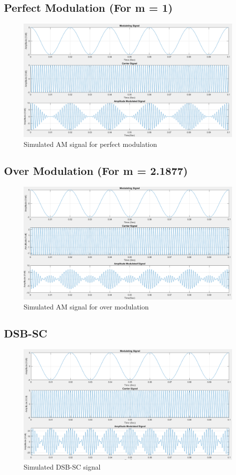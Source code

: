\documentclass{lab_sheet}
\begin{document}
  \subsection*{Perfect Modulation (For m = 1)}
  \begin{figure}[H]
    \centering
           \includegraphics[width=.9\linewidth]{Figures/sim_dsb_fc_perfect.png}
       \caption{Simulated AM signal for perfect modulation}
     \end{figure}

     \subsection*{Over Modulation (For m = 2.1877)}
     \begin{figure}[H]
       \centering
              \includegraphics[width=.9\linewidth]{Figures/sim_dsb_fc_over.png}
          \caption{Simulated AM signal for over modulation}
        \end{figure}
        \subsection{DSB-SC}
     \begin{figure}[H]
       \centering
              \includegraphics[width=.9\linewidth]{Figures/sim_dsb_sc.png}
          \caption{Simulated DSB-SC signal}
        \end{figure}
\end{document}
